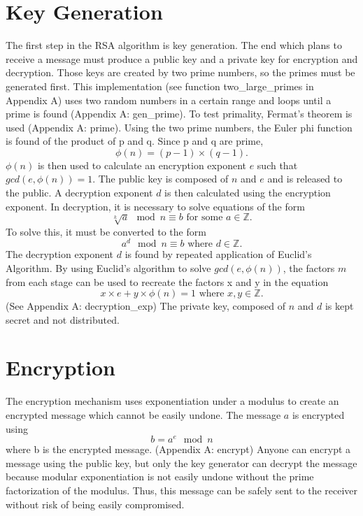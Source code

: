 \documentclass{article}
\newcommand{\Z}{\mathbb{Z}}
\begin{document}
	\section{Key Generation}
		The first step in the RSA algorithm is key generation. The end which plans to receive a message must produce a public key and a private key for encryption and decryption. Those keys are created by two prime numbers, so the primes must be generated first. This implementation (see function two\_large\_primes in Appendix A) uses two random numbers in a certain range and loops until a prime is found (Appendix A: gen\_prime). To test primality, Fermat's theorem is used (Appendix A: prime). Using the two prime numbers, the Euler phi function is found of the product of p and q. Since p and q are prime, \[ \phi(n) = (p-1) \times (q-1). \] $ \phi(n) $ is then used to calculate an encryption exponent $e$ such that $ gcd(e, \phi(n)) = 1 $. The public key is composed of $n$ and $e$ and is released to the public. A decryption exponent $d$ is then calculated using the encryption exponent. In decryption, it is necessary to solve equations of the form \[ \sqrt[k]{a} \mod n \equiv b \text{ for some } a \in \Z. \] To solve this, it must be converted to the form \[ a^d \mod n \equiv b \text{ where } d \in \Z. \] The decryption exponent $d$ is found by repeated application of Euclid's Algorithm. By using Euclid's algorithm to solve $ gcd(e, \phi(n)) $, the factors $m$ from each stage can be used to recreate the factors x and y in the equation \[ x \times e + y \times \phi(n) = 1 \text{ where } x,y \in \Z. \] (See Appendix A: decryption\_exp) The private key, composed of $n$ and $d$ is kept secret and not distributed.
	
	\section{Encryption}
		The encryption mechanism uses exponentiation under a modulus to create an encrypted message which cannot be easily undone. The message $a$ is encrypted using \[ b = a^e \mod n \] where b is the encrypted message. (Appendix A: encrypt) Anyone can encrypt a message using the public key, but only the key generator can decrypt the message because modular exponentiation is not easily undone without the prime factorization of the modulus. Thus, this message can be safely sent to the receiver without risk of being easily compromised.
	
\end{document}
